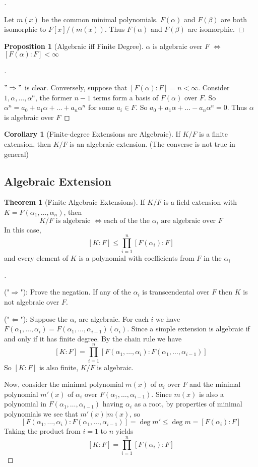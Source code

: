 \documentclass[12pt]{article}
\theoremstyle{definition}
\newtheorem{thm}{Theorem}
\newtheorem{cor}{Corollary}
\newtheorem{prop}{Proposition}
\newenvironment{proofs}[1][\proofname]{%
  \begin{proof}[#1]$ $\par\nobreak\ignorespaces
}{%
  \end{proof}
}
\begin{document}
\begin{proofs}
	Let $m(x)$ be the common minimal polynomials.
	$F(\alpha)$ and $F(\beta)$ are both isomorphic to $F[x]/(m(x))$. Thus $F(\alpha)$ and $F(\beta)$ are isomorphic.
\end{proofs}

\begin{prop}[Algebraic iff Finite Degree]
	$\alpha$ is algebraic over $F$ $\Leftrightarrow$ $[F(\alpha):F]<\infty$
\end{prop}

\begin{proofs}
	$"\Rightarrow"$ is clear. Conversely, suppose that $[F(\alpha):F]=n<\infty$. Consider $1,\alpha,\dots,\alpha^n$, the former $n-1$ terms form a basis of $F(\alpha)$ over $F$. So $\alpha^n=a_0+a_1\alpha+\dots+a_n\alpha^n$ for some $a_i\in F$. So $a_0+a_1\alpha+\dots-a_n\alpha^n=0$. Thus $\alpha$ is algebraic over $F$
\end{proofs}

\begin{cor}[Finite-degree Extensions are Algebraic]
	If $K/F$ is a finite extension, then $K/F$ is an algebraic extension. (The converse is not true in general)
\end{cor}

\subsection{Algebraic Extension}
\begin{thm}[Finite Algebraic Extensions]
	If $K/F$ is a field extension with $K=F(\alpha_1,\dots,\alpha_n)$, then
	\[K/F\text{ is algebraic }\iff \text{each of the the } \alpha_i \text{ are algebraic over } F\]
	In this case,
	\[[K:F]\le\prod_{i=1}^n [F(\alpha_i):F]\]
	and every element of $K$ is a polynomial with coefficients from $F$ in the $\alpha_i$
\end{thm}

\begin{proofs}
	("$\Rightarrow$"): Prove the negation. If any of the $\alpha_i$ is transcendental over $F$ then $K$ is not algebraic over $F$.

	("$\Leftarrow$"): Suppose the $\alpha_i$ are algebraic. For each $i$ we have $F(\alpha_1,\dots,\alpha_i)=F(\alpha_1,\dots,\alpha_{i-1})(\alpha_i)$. Since a simple extension is algebraic if and only if it has finite degree. By the chain rule we have
	\[[K:F]=\prod_{i=1}^n [F(\alpha_1,\dots,\alpha_i):F(\alpha_1,\dots,\alpha_{i-1})]\]
	So $[K:F]$ is also finite, $K/F$ is algebraic.

	Now, consider the minimal polynomial $m(x)$ of $\alpha_i$ over $F$ and the minimal polynomial $m'(x)$ of $\alpha_i$ over $F(\alpha_1,\dots,\alpha_{i-1})$. Since $m(x)$ is also a polynomial in $F(\alpha_1,\dots,\alpha_{i-1})$ having $\alpha_i$ as a root, by properties of minimal polynomials we see that $m'(x)|m(x)$, so
	\[
		[F(\alpha_1,\dots,\alpha_i):F(\alpha_1,\dots,\alpha_{i-1})]=\deg m' \le \deg m = [F(\alpha_i):F]
	\]
	Taking the product from $i=1$ to $n$ yields
	\[[K:F]=\prod_{i=1}^n [F(\alpha_i):F]\]
\end{proofs}
\end{document}
